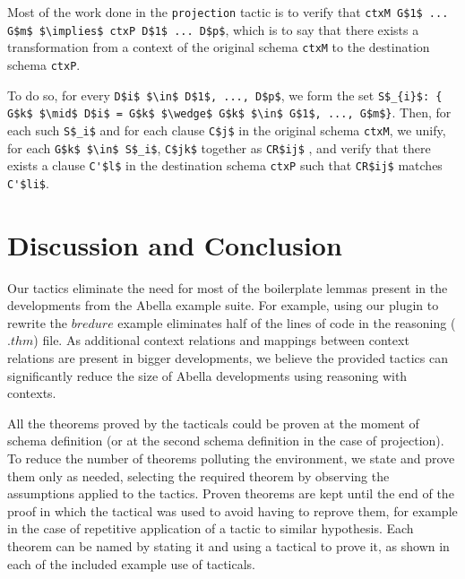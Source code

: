 \documentclass[nocopyrightspace,authoryear]{sigplanconf}
\begin{document}
Most of the work done in the \lstinline|projection| tactic is to verify that \lstinline|ctxM G$1$ ... G$m$ $\implies$ ctxP D$1$ ... D$p$|, which is to say that there exists a transformation from a context of the original schema \lstinline|ctxM| to the destination schema \lstinline|ctxP|.

To do so, for every \lstinline|D$i$ $\in$ D$1$, ..., D$p$|, we form the set 
\lstinline|S$_{i}$: { G$k$ $\mid$ D$i$ = G$k$ $\wedge$ G$k$ $\in$ G$1$, ..., G$m$}|. 
Then, for each such \lstinline|S$_i$| and for each clause \lstinline|C$j$| in the original schema \lstinline|ctxM|, we unify, for each \lstinline|G$k$ $\in$ S$_i$|, \lstinline|C$jk$| together as \lstinline|CR$ij$| , and verify that there exists a clause \lstinline|C'$l$| in the destination schema \lstinline|ctxP| such that \lstinline|CR$ij$| matches \lstinline|C'$li$|.


\begin{comment}
The $i$th context relations \lstinline|S| can be used as the $j$th projection of a context relations \lstinline|S'| if, for each clauses \lstinline|C| of \lstinline|S|, there exists a clause \lstinline|C'| of \lstinline|S'| s.t. the $i$th formula of \lstinline|C| matches the $j$th formula of \lstinline|C'|, which is to say that the $j$th projection of the schema \lstinline|S'| is more general than the $i$th projection schema \lstinline|S| .
\end{comment}


\section{Discussion and Conclusion}
Our tactics eliminate the need for most of the boilerplate lemmas present in the developments from the Abella example suite. For example, using our plugin to rewrite the $bredure$ example eliminates half of the lines of code in the reasoning ($.thm$) file. As additional context relations and mappings between context relations are present in bigger developments, we believe the provided tactics can significantly reduce the size of Abella developments using reasoning with contexts.

All the theorems proved by the tacticals could be proven at the moment of schema definition (or at the second schema definition in the case of projection). To reduce the number of theorems polluting the environment, we state and prove them only as needed, selecting the required theorem by observing the assumptions applied to the tactics. Proven theorems are kept until the end of the proof in which the tactical was used to avoid having to reprove them, for example in the case of repetitive application of a tactic to similar hypothesis. Each theorem can be named by stating it and using a tactical to prove it, as shown in each of the included example use of tacticals.
\end{document}
